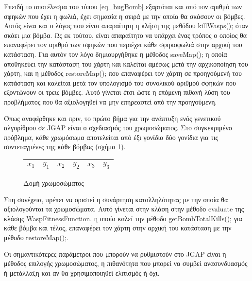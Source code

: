 Επειδή το αποτέλεσμα του τύπου \ref{eq_bugBomb} εξαρτάται και από τον αριθμό των σφηκών που έχει η φωλιά, έχει σημασία η σειρά με την οποία θα σκάσουν οι βόμβες. Αυτός είναι και ο λόγος που είναι απαραίτητη η κλήση της μεθόδου killWasps(); όταν σκάει μια βόμβα. Ως εκ τούτου, είναι απαραίτητο να υπάρχει ένας τρόπος ο οποίος θα επαναφέρει τον αριθμό των σφηκών που περιέχει κάθε σφηκοφωλιά στην αρχική του κατάσταση. Για αυτόν τον λόγο δημιουργήθηκε η μέθοδος saveMap(); η οποία αποθηκεύει την κατάσταση του χάρτη και καλείται αμέσως μετά την αρχικοποίηση του χάρτη, και η μέθοδος restoreMap(); που επαναφέρει τον χάρτη σε προηγούμενή του κατάσταση και καλείται μετά τον υπολογισμό του συνολικού αριθμού σφηκών που εξοντώνουν οι τρεις βόμβες. Αυτό γίνεται έτσι ώστε η επόμενη πιθανή λύση του προβλήματος που θα αξιολογηθεί να μην επηρεαστεί από την προηγούμενη.

Όπως αναφέρθηκε και πριν, το πρώτο βήμα για την ανάπτυξη ενός γενετικού αλγορίθμου σε JGAP είναι ο σχεδιασμός του χρωμοσώματος. Στο συγκεκριμένο πρόβλημα, κάθε χρωμόσωμα αποτελείται από έξι γονίδια \textemdash{} δύο γονίδια για τις συντεταγμένες της κάθε βόμβας (σχήμα \ref{fig_chromosomeStructure}).

\begin{figure}[!t]
    \centering
    \begin{tabular}{|c|c|c|c|c|c|}
        \hline
        $x_1$ & $y_1$ & $x_2$ & $y_2$ & $x_3$ & $y_3$\\
        \hline
    \end{tabular}
    \caption{Δομή χρωμοσώματος}
    \label{fig_chromosomeStructure}
\end{figure}

Στη συνέχεια, πρέπει να οριστεί η συνάρτηση καταλληλότητας με την οποία θα αξιολογούνται τα χρωμοσώματα. Αυτό γίνεται στην κλάση στην μέθοδο evaluate της κλάσης WaspFitnessFunction. η οποία καλεί την μέθοδο getBombTotalKills(); για κάθε βόμβα και τέλος, επαναφέρει τον χάρτη στην αρχική του κατάσταση με την μέθοδο restoreMap();.

Οι σημαντικότερες παράμετροι που μπορούν να ρυθμιστούν στο JGAP είναι η μέθοδος επιλογής χρωμοσώματος, η πιθανότητα που μπορεί να συμβεί ανασυνδυασμός ή μετάλλαξη και αν θα χρησιμοποιηθεί ελιτισμός ή όχι.

